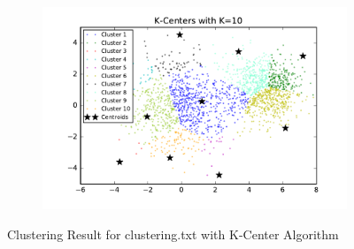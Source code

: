 \begin{figure}[htb]
\begin{subfigure}[b]{0.475\textwidth}
        \end{subfigure}
        \hfill
        \begin{subfigure}[b]{0.475\textwidth}   
            \centering 
            \includegraphics[width=\textwidth]{./figures/clustering_kCenter_10.pdf}
        \end{subfigure}
        
        \caption{Clustering Result for clustering.txt with K-Center Algorithm}
        \label{fig:kmean_clustering}
\end{figure}

